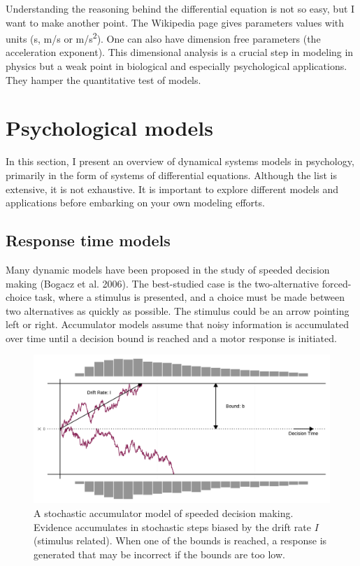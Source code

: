 \documentclass[
  a4paper,
  DIV=11,
  numbers=noendperiod]{scrreprt}
\begin{document}
Understanding the reasoning behind the differential equation is not so
easy, but I want to make another point. The Wikipedia page gives
parameters values with units (s, m/s or m/s\textsuperscript{2}). One can
also have dimension free parameters (the acceleration exponent). This
dimensional analysis is a crucial step in modeling in physics but a weak
point in biological and especially psychological applications. They
hamper the quantitative test of models.

\hypertarget{sec-Psychological-models}{%
\section{Psychological models}\label{sec-Psychological-models}}

In this section, I present an overview of dynamical systems models in
psychology, primarily in the form of systems of differential equations.
Although the list is extensive, it is not exhaustive. It is important to
explore different models and applications before embarking on your own
modeling efforts.

\hypertarget{sec-Response-time-models}{%
\subsection{Response time models}\label{sec-Response-time-models}}

Many dynamic models have been proposed in the study of speeded decision
making (Bogacz et al. 2006). The best-studied case is the
two-alternative forced-choice task, where a stimulus is presented, and a
choice must be made between two alternatives as quickly as possible. The
stimulus could be an arrow pointing left or right. Accumulator models
assume that noisy information is accumulated over time until a decision
bound is reached and a motor response is initiated.

\begin{figure}

{\centering \includegraphics{media/ch4n/fig-ch4n-img7-old-55.png}

}

\caption{\label{fig-ch4n-img7-old-55}A stochastic accumulator model of
speeded decision making. Evidence accumulates in stochastic steps biased
by the drift rate \(I\) (stimulus related). When one of the bounds is
reached, a response is generated that may be incorrect if the bounds are
too low.}

\end{figure}
\end{document}
